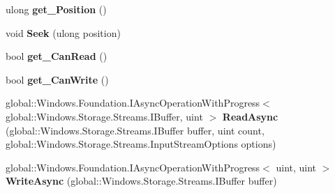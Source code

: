 \begin{DoxyCompactItemize}
\item 
\mbox{\label{class_windows_1_1_storage_1_1_streams_1_1_in_memory_random_access_stream_a60db0cabd4922fd35bbb2d64a7b381f1}} 
ulong {\bfseries get\+\_\+\+Position} ()
\item 
\mbox{\label{class_windows_1_1_storage_1_1_streams_1_1_in_memory_random_access_stream_a9dca3616e54f1113bfe6b6705612182b}} 
void {\bfseries Seek} (ulong position)
\item 
\mbox{\label{class_windows_1_1_storage_1_1_streams_1_1_in_memory_random_access_stream_aa39fd9f2f1b3be1d9282cff918d74651}} 
bool {\bfseries get\+\_\+\+Can\+Read} ()
\item 
\mbox{\label{class_windows_1_1_storage_1_1_streams_1_1_in_memory_random_access_stream_a6130af7a8779a5e32ddb40559aed883d}} 
bool {\bfseries get\+\_\+\+Can\+Write} ()
\item 
\mbox{\label{class_windows_1_1_storage_1_1_streams_1_1_in_memory_random_access_stream_add150174cbde0a2405293e8765f70bd3}} 
global\+::\+Windows.\+Foundation.\+I\+Async\+Operation\+With\+Progress$<$ global\+::\+Windows.\+Storage.\+Streams.\+I\+Buffer, uint $>$ {\bfseries Read\+Async} (global\+::\+Windows.\+Storage.\+Streams.\+I\+Buffer buffer, uint count, global\+::\+Windows.\+Storage.\+Streams.\+Input\+Stream\+Options options)
\item 
\mbox{\label{class_windows_1_1_storage_1_1_streams_1_1_in_memory_random_access_stream_a812f40b23e43e9921ef7cc08a4bb0a58}} 
global\+::\+Windows.\+Foundation.\+I\+Async\+Operation\+With\+Progress$<$ uint, uint $>$ {\bfseries Write\+Async} (global\+::\+Windows.\+Storage.\+Streams.\+I\+Buffer buffer)
\item 
\mbox{\label{class_windows_1_1_storage_1_1_streams_1_1_in_memory_random_access_stream_a43197e973b559a363116945f30e5a6da}} 

\end{DoxyCompactItemize}
